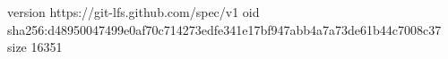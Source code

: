 version https://git-lfs.github.com/spec/v1
oid sha256:d48950047499e0af70c714273edfe341e17bf947abb4a7a73de61b44c7008c37
size 16351
